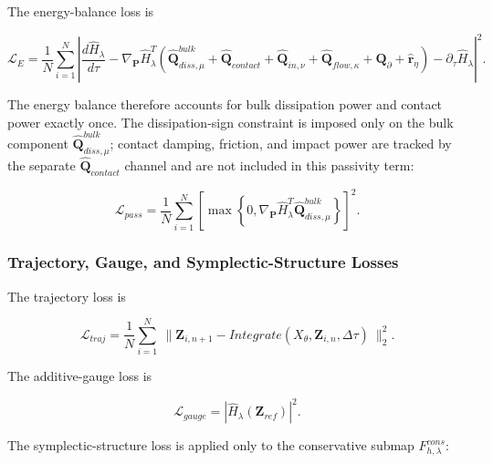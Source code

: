 The energy-balance loss is

\begin{equation}
\label{eq:chnn-4-26}
\mathcal{L}_{E} = \frac{1}{N}\sum_{i = 1}^{N}\left| \frac{d{\widehat{H}}_{\lambda}}{d\tau} - \nabla_{\mathbf{P}}{\widehat{H}}_{\lambda}^{T}\left( {\widehat{\mathbf{Q}}}_{diss,\mu}^{bulk} + {\widehat{\mathbf{Q}}}_{contact} + {\widehat{\mathbf{Q}}}_{in,\nu} + {\widehat{\mathbf{Q}}}_{flow,\kappa} + \mathbf{Q}_{\partial} + {\widehat{\mathbf{r}}}_{\eta} \right) - \partial_{\tau}{\widehat{H}}_{\lambda} \right|^{2}.
\end{equation}

The energy balance therefore accounts for bulk dissipation power and contact power exactly once. The dissipation-sign constraint is imposed only on the bulk component \({\widehat{\mathbf{Q}}}_{diss,\mu}^{bulk}\); contact damping, friction, and impact power are tracked by the separate \({\widehat{\mathbf{Q}}}_{contact}\) channel and are not included in this passivity term:

\begin{equation}
\label{eq:chnn-4-27}
\mathcal{L}_{pass} = \frac{1}{N}\sum_{i = 1}^{N}\left\lbrack \max\left\{ 0,\nabla_{\mathbf{P}}{\widehat{H}}_{\lambda}^{T}{\widehat{\mathbf{Q}}}_{diss,\mu}^{bulk} \right\} \right\rbrack^{2}.
\end{equation}

\subsubsection{Trajectory, Gauge, and Symplectic-Structure Losses}\label{sec:chnn-4-5-3}

The trajectory loss is

\begin{equation}
\label{eq:chnn-4-28}
\mathcal{L}_{traj} = \frac{1}{N}\sum_{i = 1}^{N}\left. \  \parallel \mathbf{Z}_{i,n + 1} - Integrate\left( X_{\theta},\mathbf{Z}_{i,n},\Delta\tau \right) \right.\  \parallel_{2}^{2}.
\end{equation}

The additive-gauge loss is

\begin{equation}
\label{eq:chnn-4-29}
\mathcal{L}_{gauge} = \left| {\widehat{H}}_{\lambda}\left( \mathbf{Z}_{ref} \right) \right|^{2}.
\end{equation}

The symplectic-structure loss is applied only to the conservative submap \(F_{h,\lambda}^{cons}\):

